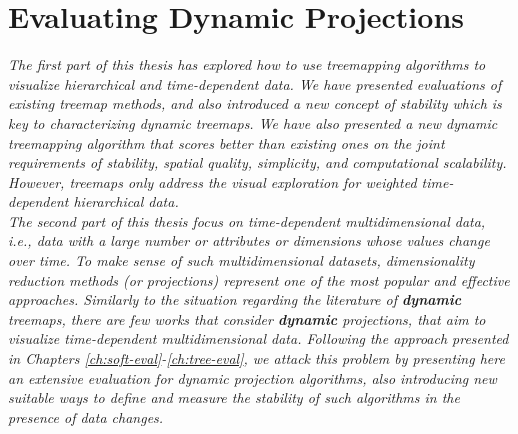 \chapter{Evaluating Dynamic Projections}
\label{ch:proj-eval}



\textit{
The first part of this thesis has explored how to use treemapping algorithms to visualize hierarchical and time-dependent data. We have presented evaluations of existing treemap methods, and also introduced a new concept of stability which is key to characterizing dynamic treemaps. We have also presented a new dynamic treemapping algorithm that scores better than existing ones on the joint requirements of stability, spatial quality, simplicity, and computational scalability. However, treemaps only address the visual exploration for weighted time-dependent hierarchical data.\\
The second part of this thesis focus on time-dependent multidimensional data, \emph{i.e.}, data with a large number or attributes or dimensions whose values change over time. 
To make sense of such multidimensional datasets, dimensionality reduction methods (or projections) represent one of the most popular and effective approaches. Similarly to the situation regarding the literature of \textbf{dynamic} treemaps, there are few works that consider \textbf{dynamic} projections, that aim to visualize time-dependent multidimensional data. 
Following the approach presented in Chapters \ref{ch:soft-eval}-\ref{ch:tree-eval}, we attack this problem by presenting here an extensive evaluation for dynamic projection algorithms, also introducing new suitable ways to define and measure the stability of such algorithms in the presence of data changes.
}

